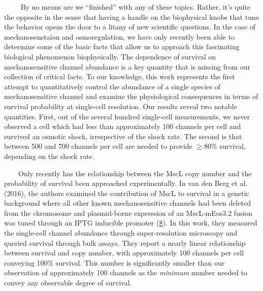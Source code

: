 ~~~~
By no
means
are we
``finished''
with
any of
these
topics.
Rather,
it's
quite
the
opposite
in the
sense
that
having
a
handle
on the
biophysical
knobs
that
tune
the
behavior
opens
the
door
to a
litany
of new
scientific
questions.
In the
case
of
mechanosenstaion
and
osmoregulation,
we
have
only
recently
been
able
to
determine
some
of the
basic
facts
that
allow
us to
approach
this
fascinating
biological
phenomenon
biophysically.
The
dependence
of
survival
on
mechanosensitive
channel
abundance
is a
key
quantity
that
is
missing
from
our
collection
of
critical
facts.
To our
knowledge,
this
work
represents
the
first
attempt
to
quantitatively
control
the
abundance
of a
single
species
of
mechanosensitive
channel
and
examine
the
physiological
consequences
in
terms
of
survival
probability
at
single-cell
resolution.
Our
results
reveal
two
notable
quantities.
First,
out of
the
several
hundred
single-cell
measurements,
we
never
observed
a cell
which
had
less
than
approximately
100
channels
per
cell
and
survived
an
osmotic
shock,
irrespective
of the
shock
rate.
The
second
is
that
between
500
and
700
channels
per
cell
are
needed
to
provide
\(\geq 80\%\)
survival,
depending
on the
shock
rate.

~~~~Only
recently
has
the
relationship
between
the
MscL
copy
number
and
the
probability
of
survival
been
approached
experimentally.
In van
den
Berg
et al.
(2016),
the
authors
examined
the
contribution
of
MscL
to
survival
in a
genetic
background
where
all
other
known
mechanosensitive
channels
had
been
deleted
from
the
chromosome
and
plasmid-borne
expression
of an
MscL-mEos3.2
fusion
was
tuned
through
an
IPTG
inducible
promoter
(\protect\hyperlink{ref-vandenberg2016}{8}).
In
this
work,
they
measured
the
single-cell
channel
abundance
through
super-resolution
microscopy
and
queried
survival
through
bulk
assays.
They
report
a
nearly
linear
relationship
between
survival
and
copy
number,
with
approximately
100
channels
per
cell
conveying
100\%
survival.
This
number
is
significantly
smaller
than
our
observation
of
approximately
100
channels
as the
\emph{minimum}
number
needed
to
convey
any
observable
degree
of
survival.


